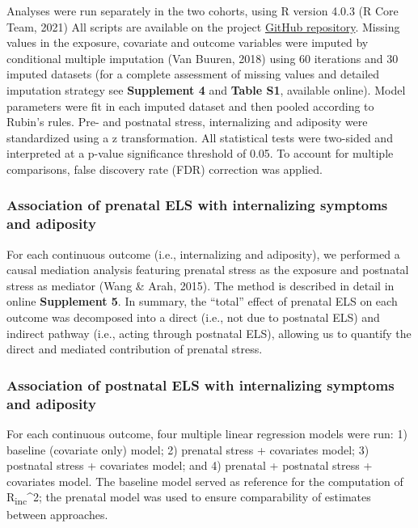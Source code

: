 \documentclass[
  letterpaper,
  DIV=11,
  numbers=noendperiod]{scrreport}
\begin{document}
Analyses were run separately in the two cohorts, using R version 4.0.3
(R Core Team, 2021) All scripts are available on the project
\href{https://github.com/SereDef/association-ELS-PCM-project}{GitHub
repository}. Missing values in the exposure, covariate and outcome
variables were imputed by conditional multiple imputation (Van Buuren,
2018) using 60 iterations and 30 imputed datasets (for a complete
assessment of missing values and detailed imputation strategy see
\textbf{Supplement 4} and \textbf{Table S1}, available online). Model
parameters were fit in each imputed dataset and then pooled according to
Rubin's rules. Pre- and postnatal stress, internalizing and adiposity
were standardized using a z transformation. All statistical tests were
two-sided and interpreted at a p-value significance threshold of 0.05.
To account for multiple comparisons, false discovery rate (FDR)
correction was applied.

\subsubsection{Association of prenatal ELS with internalizing symptoms
and
adiposity}\label{association-of-prenatal-els-with-internalizing-symptoms-and-adiposity}

For each continuous outcome (i.e., internalizing and adiposity), we
performed a causal mediation analysis featuring prenatal stress as the
exposure and postnatal stress as mediator (Wang \& Arah, 2015). The
method is described in detail in online \textbf{Supplement 5}. In
summary, the ``total'' effect of prenatal ELS on each outcome was
decomposed into a direct (i.e., not due to postnatal ELS) and indirect
pathway (i.e., acting through postnatal ELS), allowing us to quantify
the direct and mediated contribution of prenatal stress.

\subsubsection{Association of postnatal ELS with internalizing symptoms
and
adiposity}\label{association-of-postnatal-els-with-internalizing-symptoms-and-adiposity}

For each continuous outcome, four multiple linear regression models were
run: 1) baseline (covariate only) model; 2) prenatal stress + covariates
model; 3) postnatal stress + covariates model; and 4) prenatal +
postnatal stress + covariates model. The baseline model served as
reference for the computation of R\textsubscript{inc}\^{}2; the prenatal
model was used to ensure comparability of estimates between approaches.
\end{document}
